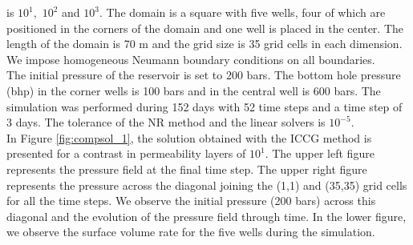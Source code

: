 \documentclass[12pt]{article}
\numberwithin{equation}{section}
\begin{document}
is $10^{1},$ $10^{2}$ and $10^{3}$.
The domain is a square with five wells, four of which are positioned in the corners of the domain and one 
well is placed in the center. The length of the domain is 70 m and the grid size is 35 grid cells in each dimension.  We impose homogeneous Neumann boundary conditions on all boundaries. \\
The initial pressure of the reservoir is set to 200 bars. The bottom hole pressure (bhp) in the corner wells is 100 bars and 
in the central well is 600 bars.  
The simulation was performed during 152 days with 52 time steps and a time step of 3 days. The tolerance of 
the NR method and the linear solvers is $10^{-5}$.\\
In Figure \ref{fig:compsol_1}, the solution obtained with the ICCG method is presented for a contrast in permeability layers of $10^{1}$. The upper left figure represents the pressure field at the final time step. The upper right 
figure represents the pressure across the diagonal joining the (1,1) and (35,35) grid cells for all the time steps. 
We observe the initial pressure (200 bars) across this diagonal and the evolution of the pressure field through time. 
In the lower figure, we observe the surface volume rate for the five wells during the simulation.
\end{document}
